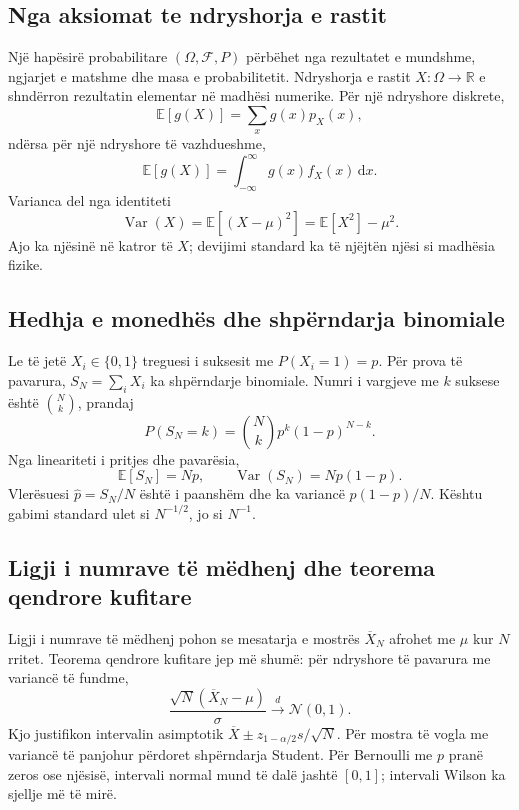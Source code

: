 \documentclass[11pt,oneside,openany]{book}
\newcommand{\E}{\mathbb{E}}
\newcommand{\Var}{\operatorname{Var}}
\newcommand{\R}{\mathbb{R}}
\newcommand{\dd}{\,\mathrm{d}}
\begin{document}
\subsection{Nga aksiomat te ndryshorja e rastit}
Një hapësirë probabilitare $(\Omega,\mathcal F,P)$ përbëhet nga rezultatet e mundshme, ngjarjet e matshme dhe masa e probabilitetit. Ndryshorja e rastit $X:\Omega\to\R$ e shndërron rezultatin elementar në madhësi numerike. Për një ndryshore diskrete,
\begin{equation}
 \E[g(X)]=\sum_x g(x)p_X(x),
\end{equation}
ndërsa për një ndryshore të vazhdueshme,
\begin{equation}
 \E[g(X)]=\int_{-\infty}^{\infty}g(x)f_X(x)\dd x.
\end{equation}
Varianca del nga identiteti
\begin{equation}
 \Var(X)=\E[(X-\mu)^2]=\E[X^2]-\mu^2.
\end{equation}
Ajo ka njësinë në katror të $X$; devijimi standard ka të njëjtën njësi si madhësia fizike.

\subsection{Hedhja e monedhës dhe shpërndarja binomiale}
Le të jetë $X_i\in\{0,1\}$ treguesi i suksesit me $P(X_i=1)=p$. Për prova të pavarura, $S_N=\sum_iX_i$ ka shpërndarje binomiale. Numri i vargjeve me $k$ suksese është $\binom Nk$, prandaj
\begin{equation}
 P(S_N=k)=\binom Nk p^k(1-p)^{N-k}.
\end{equation}
Nga lineariteti i pritjes dhe pavarësia,
\begin{equation}
 \E[S_N]=Np,\qquad \Var(S_N)=Np(1-p).
\end{equation}
Vlerësuesi $\widehat p=S_N/N$ është i paanshëm dhe ka variancë $p(1-p)/N$. Kështu gabimi standard ulet si $N^{-1/2}$, jo si $N^{-1}$.

\subsection{Ligji i numrave të mëdhenj dhe teorema qendrore kufitare}
Ligji i numrave të mëdhenj pohon se mesatarja e mostrës $\overline X_N$ afrohet me $\mu$ kur $N$ rritet. Teorema qendrore kufitare jep më shumë: për ndryshore të pavarura me variancë të fundme,
\begin{equation}
 \frac{\sqrt N(\overline X_N-\mu)}{\sigma}
 \xrightarrow{d}\mathcal N(0,1).
\end{equation}
Kjo justifikon intervalin asimptotik $\overline X\pm z_{1-\alpha/2}s/\sqrt N$. Për mostra të vogla me variancë të panjohur përdoret shpërndarja Student. Për Bernoulli me $p$ pranë zeros ose njësisë, intervali normal mund të dalë jashtë $[0,1]$; intervali Wilson ka sjellje më të mirë.
\end{document}
